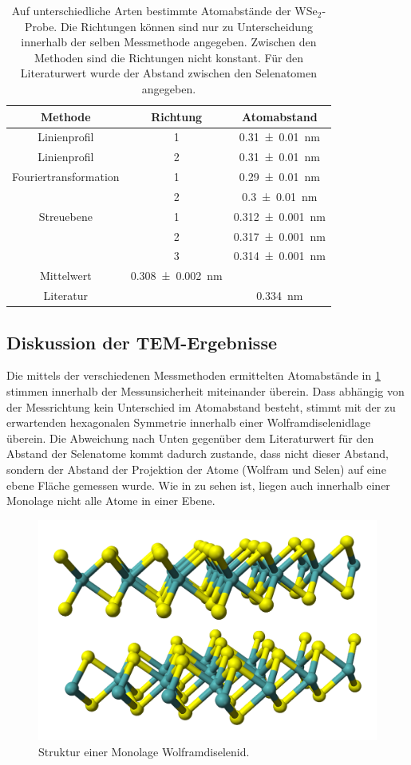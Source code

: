 	\begin{table}
		\centering
		\caption{Auf unterschiedliche Arten bestimmte Atomabstände der WSe$_2$-Probe. Die Richtungen können sind nur zu Unterscheidung innerhalb der selben Messmethode angegeben. Zwischen den Methoden sind die Richtungen nicht konstant.
    Für den Literaturwert wurde der Abstand zwischen den Selenatomen angegeben.}
		\begin{tabular}{c| c | c}
			Methode & Richtung & Atomabstand \\ \hline
      Linienprofil &  1 & \SI{0.31 \pm 0.01}{nm}\\
      Linienprofil &  2 & \SI{0.31 \pm 0.01}{nm}\\
      Fouriertransformation & 1 & \SI{0.29 \pm 0.01}{nm}\\
      & 2 & \SI{0.3 \pm 0.01}{nm}\\
      Streuebene & 1 & \SI{0,312 \pm 0.001}{nm} \\
      & 2 & \SI{0,317 \pm 0.001}{nm} \\
      & 3 & \SI{0,314 \pm 0.001}{nm} \\
      Mittelwert & \SI{0,308 \pm 0.002}{nm}& \\
      Literatur & & \SI{0,334}{nm} \cite{wiki_wse}\\
		\end{tabular}
		\label{tab:netz}
	\end{table}

\subsection{Diskussion der TEM-Ergebnisse}

  Die mittels der verschiedenen Messmethoden ermittelten Atomabstände in \cref{tab:netz} stimmen innerhalb der Messunsicherheit miteinander überein.
  Dass abhängig von der Messrichtung kein Unterschied im Atomabstand besteht, stimmt mit der zu erwartenden hexagonalen Symmetrie innerhalb einer Wolframdiselenidlage überein.
  Die Abweichung nach Unten gegenüber dem Literaturwert für den Abstand der Selenatome kommt dadurch zustande, dass nicht dieser Abstand, sondern der Abstand der Projektion der Atome (Wolfram und Selen) auf eine ebene Fläche gemessen wurde.
  Wie in zu sehen ist, liegen auch innerhalb einer Monolage nicht alle Atome in einer Ebene.

	\begin{figure}[H]
  \centering
			\includegraphics[width= 0.6 \linewidth]{img/strukt}
			\caption{
        Struktur einer Monolage Wolframdiselenid. \cite{wiki_wse_bild}
			}
			\label{fig:diff}
	\end{figure}

